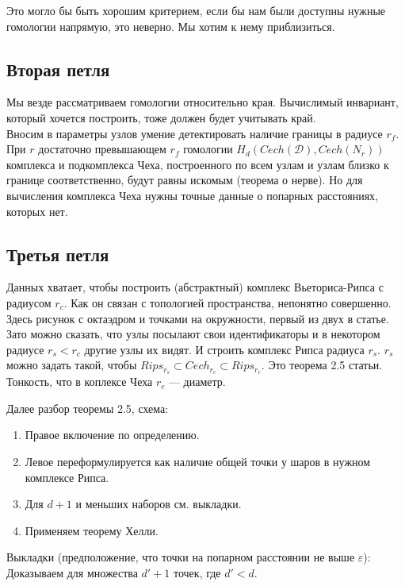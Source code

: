 \documentclass[english,12pt]{article}
\numberwithin{equation}{section}
\theoremstyle{definition}
\theoremstyle{remark}
\begin{document}
Это могло бы быть хорошим критерием, если бы нам были доступны нужные гомологии напрямую, это неверно. Мы хотим к нему приблизиться.

\subsection{Вторая петля}

Мы везде рассматриваем гомологии относительно края. Вычислимый инвариант, который хочется построить, тоже должен будет учитывать край.\\

Вносим в параметры узлов умение детектировать наличие границы в радиусе $r_f$. При $r$ достаточно превышающем $r_f$ гомологии $H_d(Cech(\mathcal{D}), Cech(N_r))$ комплекса и подкомплекса Чеха, построенного по всем узлам и узлам близко к границе соответственно, будут равны искомым (теорема о нерве). Но для вычисления комплекса Чеха нужны точные данные о попарных расстояниях, которых нет.

\subsection{Третья петля}

Данных хватает, чтобы построить (абстрактный) комплекс Вьеториса-Рипса с радиусом $r_c$. Как он связан с топологией пространства, непонятно совершенно. Здесь рисунок с октаэдром и точками на окружности, первый из двух в статье. Зато можно сказать, что узлы посылают свои идентификаторы и в некотором радиусе $r_s < r_c$ другие узлы их видят. И строить комплекс Рипса радиуса $r_s$. $r_s$ можно задать такой, чтобы $Rips_{r_s} \subset Cech_{r_c} \subset Rips_{r_c}$. Это теорема 2.5 статьи. Тонкость, что в коплексе Чеха $r_c$ --- диаметр.

Далее разбор теоремы 2.5, схема:
\begin{enumerate}
  \item Правое включение по определению.
  \item Левое переформулируется как наличие общей точки у шаров в нужном комплексе Рипса.
  \item Для $d+1$ и меньших наборов см. выкладки.
  \item Применяем теорему Хелли.
\end{enumerate}

Выкладки (предположение, что точки на попарном расстоянии не выше $\varepsilon$):\\

Доказываем для множества $d'+1$ точек, где $d' < d$.\\
\end{document}
